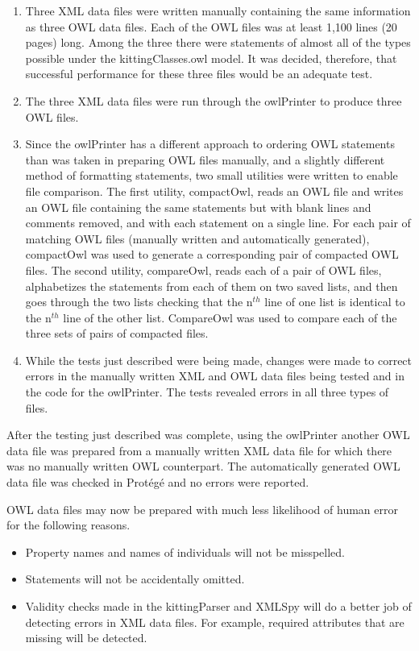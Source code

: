 \begin{enumerate}[ (i) ]
\item Three XML data files were written manually containing the same
  information as three OWL data files. Each of the OWL files was at least
  1,100 lines (20 pages) long. Among the three there were statements of
  almost all of the types possible under the kittingClasses.owl model. It was
  decided, therefore, that successful performance for these three files
  would be an adequate test.
\item The three XML data files were run through the owlPrinter to produce
  three OWL files.
\item Since the owlPrinter has a different approach to ordering OWL
  statements than was taken in preparing OWL files manually, and a slightly
  different method of formatting statements, two small utilities were
  written to enable file comparison. The first utility, compactOwl, reads
  an OWL file and writes an OWL file containing the same statements but
  with blank lines and comments removed, and with each statement on a
  single line. For each pair of matching OWL files (manually written and
  automatically generated), compactOwl was used to generate a corresponding
  pair of compacted OWL files. The second utility, compareOwl, reads each
  of a pair of OWL files, alphabetizes the statements from each of them on
  two saved lists, and then goes through the two lists checking that the
  n$^{th}$ line of one list is identical to the n$^{th}$ line of the other list.
  CompareOwl was used to compare each of the three sets of pairs of
  compacted files.
\item While the tests just described were being made, changes were made to
  correct errors in the manually written XML and OWL data files being
  tested and in the code for the owlPrinter. The tests revealed errors in
  all three types of files.
\end{enumerate}

After the testing just described was complete, using the owlPrinter
another OWL data file was prepared from a manually written XML data file
for which there was no manually written OWL counterpart. The automatically
generated OWL data file was checked in  Prot\'{e}g\'{e} and no errors were reported.

OWL data files
may now be prepared with much less likelihood of human error for the following
reasons.
\begin{itemize}

\item Property names and names of individuals will not be misspelled.

\item Statements will not be accidentally omitted.

\item Validity checks made in the kittingParser and XMLSpy will do a
  better job of detecting errors in XML data files. For example, required
  attributes that are missing will be detected.

\end{itemize}

